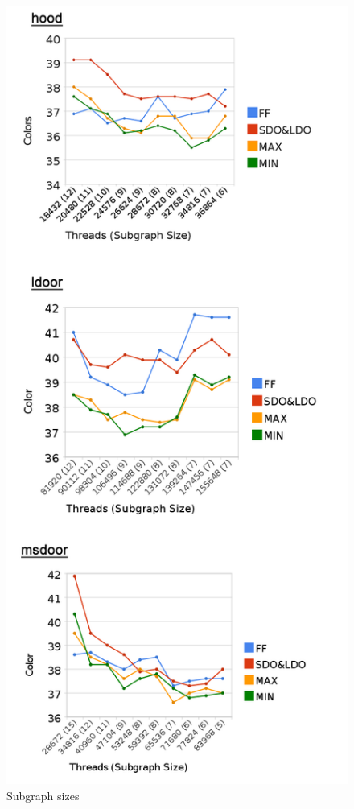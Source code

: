 \documentclass[preprint]{sigplanconf}
\begin{document}
\begin{figure}
  \centering
  \includegraphics[scale=0.4]{figures/automotiveColors.png}
  \caption{ Subgraph sizes }
\end{figure}
\end{document}
